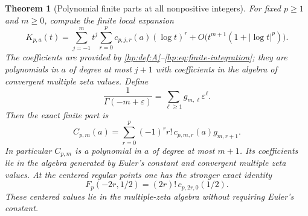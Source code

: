 \documentclass[11pt,a4paper]{article}
\numberwithin{equation}{section}
\newtheorem{theorem}{Theorem}[section]
\theoremstyle{definition}
\theoremstyle{remark}
\begin{document}
\begin{theorem}[Polynomial finite parts at all nonpositive integers]
\label{hp:thm:finiteparts}
For fixed $p\ge1$ and $m\ge0$, compute the finite local expansion
\begin{equation}\label{hp:eq:local-kernel}
 K_{p,a}(t)=\sum_{j=-1}^{m}t^j
         \sum_{r=0}^p c_{p,j,r}(a)(\log t)^r
       +O\bigl(t^{m+1}(1+|\log t|^p)\bigr).
\end{equation}
The coefficients are provided by
\eqref{hp:def:A}--\eqref{hp:eq:finite-integration}; they are polynomials
in $a$ of degree at most $j+1$ with coefficients in the algebra of
convergent multiple zeta values. Define
\begin{equation}\label{hp:def:g}
 \frac1{\Gamma(-m+\varepsilon)}
      =\sum_{\ell\ge1}g_{m,\ell}\varepsilon^\ell.
\end{equation}
Then the exact finite part is
\begin{equation}\label{hp:eq:FP-all}
 \boxed{\quad C_{p,m}(a)=
   \sum_{r=0}^p(-1)^rr!\,c_{p,m,r}(a)g_{m,r+1}.\quad}
\end{equation}
In particular $C_{p,m}$ is a polynomial in $a$ of degree at most
$m+1$. Its coefficients lie in the algebra generated by Euler's
constant and convergent multiple zeta values. At the centered regular
points one has the stronger exact identity
\begin{equation}\label{hp:eq:center-value}
 F_p(-2r,1/2)=(2r)!\,c_{p,2r,0}(1/2).
\end{equation}
These centered values lie in the multiple-zeta algebra without requiring
Euler's constant.
\end{theorem}
\end{document}
